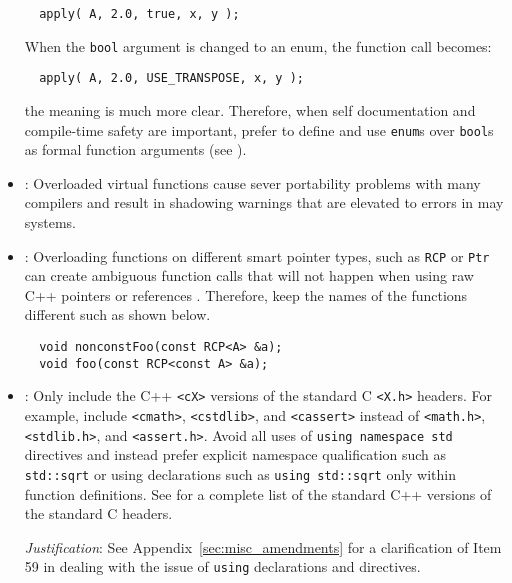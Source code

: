 \begin{itemize}
{\small\begin{verbatim}
  apply( A, 2.0, true, x, y );\end{verbatim}}

When the {}\texttt{bool} argument is changed to an enum, the function call
becomes:

{\small\begin{verbatim}
  apply( A, 2.0, USE_TRANSPOSE, x, y );
\end{verbatim}}

the meaning is much more clear.  Therefore, when self documentation and
compile-time safety are important, prefer to define and use {}\texttt{enum}s
over {}\texttt{bool}s as formal function arguments (see {}\cite[Section
12.6]{CodeComplete2nd04}).

{}\item\GCGOverloadedVirtualFunctions: Overloaded virtual functions cause
sever portability problems with many compilers and result in shadowing
warnings that are elevated to errors in may systems.


{}\item\GCGAvoidSmartPtrFuncOverloads: Overloading functions on different
smart pointer types, such as {}\texttt{RCP} or {}\texttt{Ptr} can create
ambiguous function calls that will not happen when using raw C++ pointers or
references {}\cite{TeuchosMemoryManagementGuide}.  Therefore, keep the names
of the functions different such as shown below.

{\small\begin{verbatim}
  void nonconstFoo(const RCP<A> &a);
  void foo(const RCP<const A> &a);
\end{verbatim}}


{}\item\GCGStandardCppHeaders: Only include the C++ {}\texttt{<cX>} versions
of the standard C {}\texttt{<X.h>} headers.  For example, include
{}\texttt{<cmath>}, {}\texttt{<cstdlib>}, and {}\texttt{<cassert>} instead of
{}\texttt{<math.h>}, {}\texttt{<stdlib.h>}, and {}\texttt{<assert.h>}.  Avoid
all uses of {}\texttt{using namespace std} directives and instead prefer
explicit namespace qualification such as {}\texttt{std::sqrt} or using
declarations such as {}\texttt{using std::sqrt} only within function
definitions.  See {}\cite[Section 16.1.2]{stroustrup97} for a complete list of
the standard C++ versions of the standard C headers.

{}\textit{Justification}: See Appendix~\ref{sec:misc_amendments} for a
clarification of Item 59 in {}\cite{C++CodingStandards05} dealing with the
issue of {}\texttt{using} declarations and directives.



\end{itemize}
